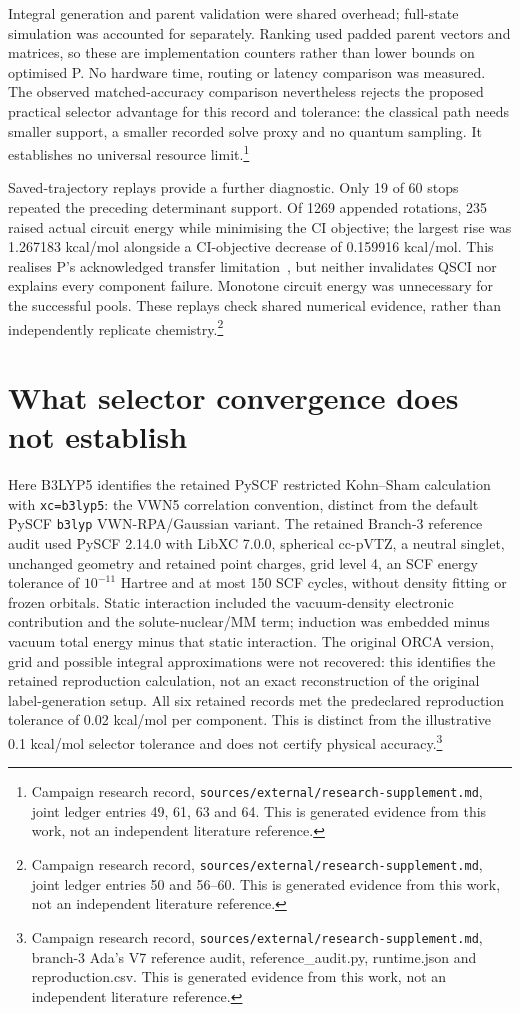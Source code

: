 \documentclass{article}
\newcommand{\record}[1]{\footnote{Campaign research record, \texttt{sources/external/research-supplement.md}, #1. This is generated evidence from this work, not an independent literature reference.}}
\begin{document}
Integral generation and parent validation were shared overhead; full-state simulation was accounted for separately. Ranking used padded parent vectors and matrices, so these are implementation counters rather than lower bounds on optimised P. No hardware time, routing or latency comparison was measured. The observed matched-accuracy comparison nevertheless rejects the proposed practical selector advantage for this record and tolerance: the classical path needs smaller support, a smaller recorded solve proxy and no quantum sampling. It establishes no universal resource limit.\record{joint ledger entries 49, 61, 63 and 64}

Saved-trajectory replays provide a further diagnostic. Only 19 of 60 stops repeated the preceding determinant support. Of 1269 appended rotations, 235 raised actual circuit energy while minimising the CI objective; the largest rise was 1.267183 kcal/mol alongside a CI-objective decrease of 0.159916 kcal/mol. This realises P's acknowledged transfer limitation~\cite{P}, but neither invalidates QSCI nor explains every component failure. Monotone circuit energy was unnecessary for the successful pools. These replays check shared numerical evidence, rather than independently replicate chemistry.\record{joint ledger entries 50 and 56--60}

\section{What selector convergence does not establish}
Here B3LYP5 identifies the retained PySCF restricted Kohn--Sham calculation with \texttt{xc=b3lyp5}: the VWN5 correlation convention, distinct from the default PySCF \texttt{b3lyp} VWN-RPA/Gaussian variant. The retained Branch-3 reference audit used PySCF 2.14.0 with LibXC 7.0.0, spherical cc-pVTZ, a neutral singlet, unchanged geometry and retained point charges, grid level 4, an SCF energy tolerance of \(10^{-11}\) Hartree and at most 150 SCF cycles, without density fitting or frozen orbitals. Static interaction included the vacuum-density electronic contribution and the solute-nuclear/MM term; induction was embedded minus vacuum total energy minus that static interaction. The original ORCA version, grid and possible integral approximations were not recovered: this identifies the retained reproduction calculation, not an exact reconstruction of the original label-generation setup. All six retained records met the predeclared reproduction tolerance of 0.02 kcal/mol per component. This is distinct from the illustrative 0.1 kcal/mol selector tolerance and does not certify physical accuracy.\record{branch-3 Ada's V7 reference audit, reference\_audit.py, runtime.json and reproduction.csv}
\end{document}
